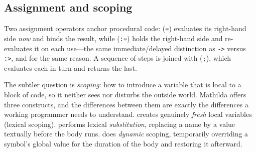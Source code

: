 \subsection{Assignment and scoping}
\label{ssec:prog-scoping}

Two assignment operators anchor procedural code:  (\texttt{=}) evaluates
its right-hand side \emph{now} and binds the result, while 
(\texttt{:=}) holds the right-hand side and re-evaluates it on each use---the same
immediate/delayed distinction as \texttt{->} versus \texttt{:>}, and for the same
reason. A sequence of steps is joined with 
(\texttt{;}), which evaluates each in turn and returns the last.

The subtler question is \emph{scoping}: how to introduce a variable that is local
to a block of code, so it neither sees nor disturbs the outside world. Mathilda
offers three constructs, and the differences between them are exactly the
differences a working programmer needs to understand.  creates genuinely
\emph{fresh} local variables (lexical scoping).  performs lexical
\emph{substitution}, replacing a name by a value textually before the body runs.
 does \emph{dynamic} scoping, temporarily overriding a symbol's global
value for the duration of the body and restoring it afterward.

\begin{codepairs}
\end{codepairs}

